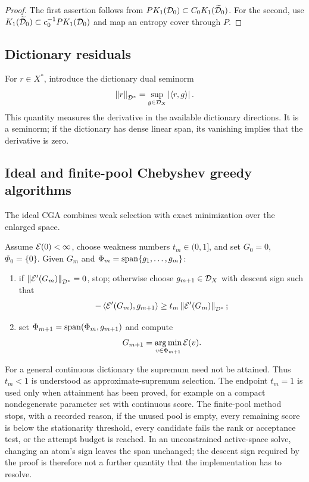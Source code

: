 \begin{proof}
The first assertion follows from
\(PK_1(\mathcal{D}_0)\subset C_0K_1(\widetilde{\mathcal{D}}_0)\). For the second, use
\(K_1(\widetilde{\mathcal{D}}_0)\subset c_0^{-1}PK_1(\mathcal{D}_0)\) and map an entropy cover through \(P\).
\end{proof}

\subsection{Dictionary residuals}

For \(r\in X^*\), introduce the dictionary dual seminorm
\[
  \left\lVert r\right\rVert_{\mathcal{D}^*}=\sup_{g\in\mathcal{D}_X}\left\lvert \left\langle r,g\right\rangle\right\rvert.
\]
This quantity measures the derivative in the available dictionary directions. It is a seminorm;
if the dictionary has dense linear span, its vanishing implies that the derivative is zero.

\subsection{Ideal and finite-pool Chebyshev greedy algorithms}

The ideal CGA combines weak selection with exact minimization over the enlarged space.

\begin{algorithm}
\label{alg:continuous}
Assume \(\mathcal{E}(0)<\infty\), choose weakness numbers \(t_m\in(0,1]\), and set
\(G_0=0\), \(\Phi_0=\{0\}\). Given
\(G_m\) and \(\Phi_m=\operatorname{span}\{g_1,\ldots,g_m\}\):
\begin{enumerate}[label=\textup{(\roman*)}]
  \item if \(\left\lVert \mathcal{E}'(G_m)\right\rVert_{\mathcal{D}^*}=0\), stop; otherwise choose \(g_{m+1}\in\mathcal{D}_X\) with descent sign such that
  \[
  -\left\langle \mathcal{E}'(G_m),g_{m+1}\right\rangle
  \geq t_m\left\lVert \mathcal{E}'(G_m)\right\rVert_{\mathcal{D}^*};
  \]
  \item set \(\Phi_{m+1}=\operatorname{span}(\Phi_m,g_{m+1})\) and compute
  \[
    G_{m+1}=\operatorname*{arg\,min}_{v\in\Phi_{m+1}}\mathcal{E}(v).
  \]
\end{enumerate}
\end{algorithm}

For a general continuous dictionary the supremum need not be attained. Thus \(t_m<1\) is understood as
approximate-supremum selection. The endpoint \(t_m=1\) is used only when attainment has been proved,
for example on a compact nondegenerate parameter set with continuous score. The finite-pool method
stops, with a recorded reason, if the unused pool is empty, every remaining score is below the
stationarity threshold, every candidate fails the rank or acceptance test, or the attempt budget is
reached. In an unconstrained active-space solve, changing an atom's sign leaves the span unchanged;
the descent sign required by the proof is therefore not a further quantity that the implementation
has to resolve.

